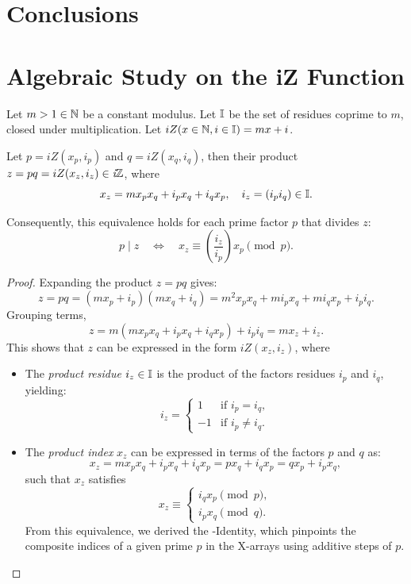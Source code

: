 \documentclass{article}
\begin{document}
\section{Conclusions}


\appendix

\section{Algebraic Study on the iZ Function}

\medskip
\begin{lemma}
    \label{lem:iZ}
    Let $m > 1 \in \mathbb{N}$ be a constant modulus.
    Let $\mathbb{I}$ be the set of residues coprime to $m$, closed under multiplication.
    Let $iZ(x \in \mathbb{N}, i \in \mathbb{I}) = mx + i$.

    \noindent 
    Let $p=iZ(x_p,i_p)$ and $q=iZ(x_q,i_q)$, then their product $z=pq=iZ(x_z,i_z)\in\textit{i}\mathbb{Z}$, where
    \[
    x_z = m x_p x_q + i_p x_q + i_q x_p,
    \quad
    i_z = (i_p i_q) \in \mathbb{I}.
    \]

    \noindent 
    Consequently, this equivalence holds for each prime factor $p$ that divides $z$:
    \[
    p \mid z \quad \Longleftrightarrow \quad x_z \equiv (\frac{i_z}{i_p}) x_p \pmod{p}.
    \]
\end{lemma}

\begin{proof} \label{proof:iZ}
Expanding the product $z = pq$ gives:
\[
z = pq = (m x_p + i_p)(m x_q + i_q) = m^2 x_p x_q + m i_p x_q + m i_q x_p + i_p i_q.
\]
\noindent Grouping terms,
\[
z = m (m x_p x_q + i_p x_q + i_q x_p) + i_p i_q = m x_z + i_z.
\]
This shows that $z$ can be expressed in the form $iZ(x_z, i_z)$, where
\begin{itemize}[leftmargin=*]
    \item The \emph{product residue} $i_z \in\mathbb{I}$ is the product of the factors residues $i_p$ and $i_q$, yielding:
    $$
    i_z = \begin{cases}
    1 & \text{if } i_p = i_q,\\
    -1 & \text{if } i_p \neq i_q.
    \end{cases}
    $$
    \item The \emph{product index} $x_z$ can be expressed in terms of the factors $p$ and $q$ as:
    $$
    x_z = m x_p x_q + i_p x_q + i_q x_p = p x_q + i_q x_p = q x_p + i_p x_q,
    $$
    such that $x_z$ satisfies
    $$
    x_z \equiv \begin{cases}
    i_q x_p \pmod{p},\\
    i_p x_q \pmod{q}.
    \end{cases}
    $$
    From this equivalence, we derived the \Xp-Identity, which pinpoints the composite indices of a given prime $p$ in the X-arrays using additive steps of $p$.
\end{itemize}
\end{proof}
\end{document}
